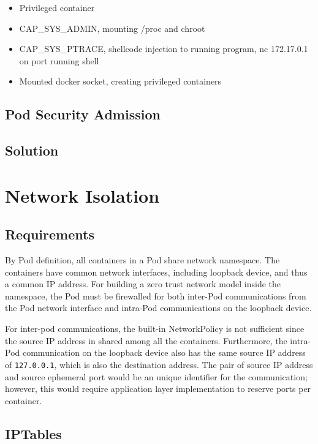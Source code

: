 \documentclass[english, 12pt, a4paper, sci, utf8, a-2b, online]{aaltothesis}
\begin{document}
\cite{nsa-cisa-hardening}




\begin{itemize}
  \item Privileged container
  \item CAP\_SYS\_ADMIN, mounting /proc and chroot
  \item CAP\_SYS\_PTRACE, shellcode injection to running program, nc 172.17.0.1 on port running shell
  \item Mounted docker socket, creating privileged containers
\end{itemize}

\subsection{Pod Security Admission}

\subsection{Solution}

\clearpage

\section{Network Isolation}

\subsection{Requirements}

By Pod definition, all containers in a Pod share network namespace. The containers have common network interfaces, including loopback device, and thus a common IP address. For building a zero trust network model inside the namespace, the Pod must be firewalled for both inter-Pod communications from the Pod network interface and intra-Pod communications on the loopback device.

For inter-pod communications, the built-in NetworkPolicy is not sufficient since the source IP address in shared among all the containers. Furthermore, the intra-Pod communication on the loopback device also has the same source IP address of \texttt{127.0.0.1}, which is also the destination address. The pair of source IP address and source ephemeral port would be an unique identifier for the communication; however, this would require application layer implementation to reserve ports per container.

\subsection{IPTables}
\end{document}
